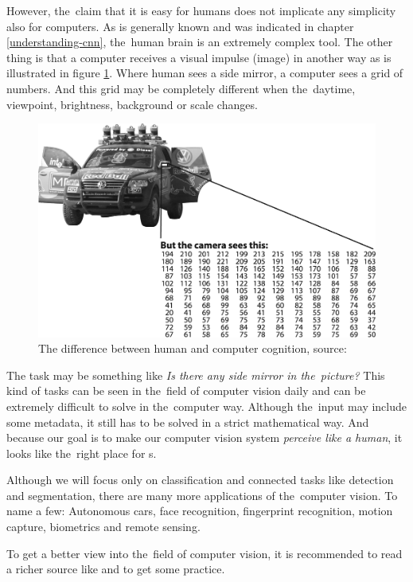However, the~claim that it is easy for humans does not implicate any
simplicity also for computers. As is generally known and was indicated in 
chapter \ref{understanding-cnn}, the~human brain is an extremely complex tool. 
The other thing is that a computer receives a visual impulse (image) in another 
way as is illustrated in figure \ref{fig:mirror}. Where human sees a side 
mirror, a computer sees a grid of numbers. And this grid may be completely 
different when the~daytime, viewpoint, brightness, background or scale changes.

\begin{figure}[H]
   \centering
	\includegraphics[width=.8\linewidth]{./pictures/comp-vision.png}
	\caption[Human and computer cognition]{The difference between human and 
computer cognition, source: \cite{opencv}}
      \label{fig:mirror}
\end{figure}

The task may be something like \textit{Is there any side mirror in the~picture?} 
This kind of tasks can be seen in the~field of computer vision daily and can be 
extremely difficult to solve in the~computer way. Although the~input may include 
some metadata, it still has to be solved in a strict mathematical way. And 
because our goal is to make our computer vision system \textit{perceive like a 
human}, it looks like the~right place for s.

Although we will focus only on classification and connected tasks like detection 
and segmentation, there are many more applications of the~computer vision. To 
name a few: Autonomous cars, face recognition, fingerprint recognition, motion 
capture, biometrics and remote sensing.

To get a better view into the~field of computer vision, it is recommended to 
read a richer source like \cite{comp-vision} and \cite{opencv} to get some 
practice.

